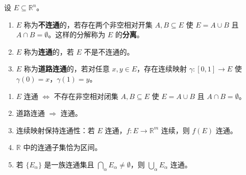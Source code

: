 \begin{definition}[连通性]\label{def:connectedness}
设 $E \subseteq \mathbb{R}^n$。
\begin{enumerate}[label=(\roman*)]
    \item $E$ 称为\textbf{不连通}的，若存在两个非空相对开集 $A, B \subseteq E$ 使 $E = A \cup B$ 且 $A \cap B = \emptyset$。这样的分解称为 $E$ 的\textbf{分离}。
    \item $E$ 称为\textbf{连通}的，若 $E$ 不是不连通的。
    \item $E$ 称为\textbf{道路连通}的，若对任意 $x, y \in E$，存在连续映射 $\gamma: [0, 1] \to E$ 使 $\gamma(0) = x$，$\gamma(1) = y$。
\end{enumerate}
\end{definition}

\begin{proposition}[连通集的基本性质]\label{prop:connected_properties}
\begin{enumerate}[label=(\roman*)]
    \item $E$ 连通 $\iff$ 不存在非空相对闭集 $A, B \subseteq E$ 使 $E = A \cup B$ 且 $A \cap B = \emptyset$。
    \item 道路连通 $\Rightarrow$ 连通。
    \item 连续映射保持连通性：若 $E$ 连通，$f: E \to \mathbb{R}^m$ 连续，则 $f(E)$ 连通。
    \item $\mathbb{R}$ 中的连通子集恰为区间。
    \item 若 $\{E_\alpha\}$ 是一族连通集且 $\bigcap_\alpha E_\alpha \neq \emptyset$，则 $\bigcup_\alpha E_\alpha$ 连通。
\end{enumerate}
\end{proposition}

